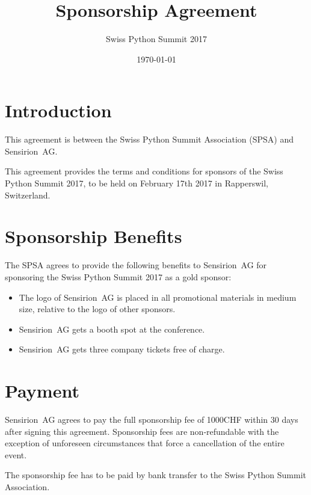 \documentclass[11pt,enlargefirstpage=true,headlines=4]{scrartcl}
\title{Sponsorship Agreement}
\subtitle{Swiss Python Summit 2017}
\date{\today} %
\begin{document}
    \maketitle

    \section{Introduction}

    This agreement is between the Swiss Python Summit Association (SPSA) and
    Sensirion~AG.

    This agreement provides the terms and conditions for sponsors of the Swiss
    Python Summit 2017, to be held on February 17th 2017 in Rapperswil,
    Switzerland.

    \section{Sponsorship Benefits}

    The SPSA agrees to provide the following benefits to Sensirion~AG for
    sponsoring the Swiss Python Summit 2017 as a gold sponsor:

    \begin{itemize}
        \item The logo of Sensirion~AG is placed in all promotional materials in medium size, relative to the logo of other sponsors.
        \item Sensirion~AG gets a booth spot at the conference.
        \item Sensirion~AG gets three company tickets free of charge.
    \end{itemize}

    \section{Payment}

    Sensirion~AG agrees to pay the full sponsorship fee of 1000CHF within 30 days
    after signing this agreement. Sponsorship fees are non‐refundable with the
    exception of unforeseen circumstances that force a cancellation of the entire
    event.

    The sponsorship fee has to be paid by bank transfer to the Swiss Python
    Summit Association.

    \quad
\end{document}
